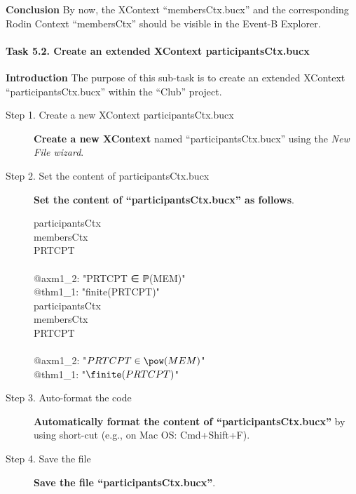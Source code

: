 \textbf{Conclusion} By now, the XContext ``membersCtx.bucx'' and the corresponding Rodin Context ``membersCtx'' should be visible in the Event-B Explorer.

\paragraph{Task 5.2. Create an extended XContext participantsCtx.bucx}
\textbf{Introduction} The purpose of this sub-task is to create an extended XContext ``participantsCtx.bucx'' within the ``Club'' project.

\begin{description}
\item[Step 1. Create a new XContext participantsCtx.bucx] \textbf{Create a new XContext} named ``participantsCtx.bucx'' using the \emph{New File wizard}.

\item[Step 2. Set the content of participantsCtx.bucx] \textbf{Set the content of ``participantsCtx.bucx'' as follows}.
  \begin{center}
    \begin{Bcode}
      \ifplastex
      \Bcontext{} participantsCtx\\
      \Bextends{} membersCtx\\
      \Bconstants{} PRTCPT\\
      \Baxioms\\
      @axm1_2: "PRTCPT ∈ ℙ(MEM)"\\
      @thm1_1: "finite(PRTCPT)" \Btheorem\\
      \Bend
      \else
      \Bcontext{} participantsCtx\\
      \Bextends{} membersCtx\\
      \Bconstants{} PRTCPT\\
      \Baxioms\\
      \Btab @axm1_2: "\(PRTCPT \in \pow(MEM)\)"\\
      \Btab @thm1_1: "\(\finite(PRTCPT)\)" \Btheorem\\
      \Bend
      \fi
    \end{Bcode}
  \end{center}

\item[Step 3. Auto-format the code] \textbf{Automatically format the content of ``participantsCtx.bucx''} by using short-cut (e.g., on Mac OS: Cmd+Shift+F).

\item[Step 4. Save the file] \textbf{Save the file ``participantsCtx.bucx''}.
\end{description}

